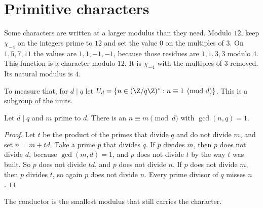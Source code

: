 \section{Primitive characters}

Some characters are written at a larger modulus than they need. Modulo $12$, keep $\chi_{-4}$ on the integers prime to $12$ and set the value $0$ on the multiples of $3$. On $1,5,7,11$ the values are $1,1,-1,-1$, because those residues are $1,1,3,3$ modulo $4$. This function is a character modulo $12$. It is $\chi_{-4}$ with the multiples of $3$ removed. Its natural modulus is $4$.

To measure that, for $d\mid q$ let $U_d=\{n\in(\Z/q\Z)^*:n\equiv1\pmod d\}$. This is a subgroup of the units.

\begin{lemma}\label{lem:lift}
Let $d\mid q$ and $m$ prime to $d$. There is an $n\equiv m\pmod d$ with $\gcd(n,q)=1$.
\end{lemma}
\begin{proof}
Let $t$ be the product of the primes that divide $q$ and do not divide $m$, and set $n=m+td$. Take a prime $p$ that divides $q$. If $p$ divides $m$, then $p$ does not divide $d$, because $\gcd(m,d)=1$, and $p$ does not divide $t$ by the way $t$ was built. So $p$ does not divide $td$, and $p$ does not divide $n$. If $p$ does not divide $m$, then $p$ divides $t$, so again $p$ does not divide $n$. Every prime divisor of $q$ misses $n$.
\end{proof}

The conductor is the smallest modulus that still carries the character.

